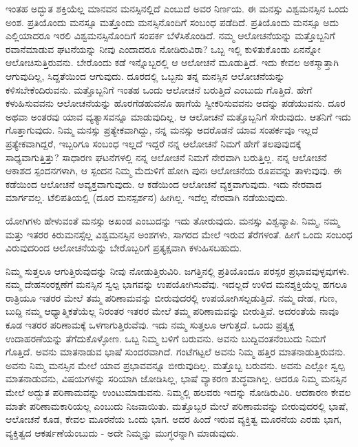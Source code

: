 ಇಂತಹ ಅದ್ಭುತ ಶಕ್ತಿಯೆಲ್ಲ ಮಾನವನ ಮನಸ್ಸಿನಲ್ಲಿದೆ ಎಂಬುದೆ ಅವರ ನಿರ್ಣಯ. ಈ ಮನಸ್ಸು ವಿಶ್ವಮನಸ್ಸಿನ ಒಂದು ಅಂಶ. ಪ್ರತಿಯೊಂದು ಮನಸ್ಸೂ ಮತ್ತೊಂದು ಮನಸ್ಸಿನೊಂದಿಗೆ ಸಂಬಂಧ ಪಡೆದಿದೆ. ಪ್ರತಿಯೊಂದು ಮನಸ್ಸೂ ಅದು ಎಲ್ಲಿಯಾದರೂ ಇರಲಿ ವಿಶ್ವಮನಸ್ಸಿನೊಂದಿಗೆ ಸಂಪರ್ಕ ಬೆಳೆಸಿಕೊಂಡಿದೆ. ನಮ್ಮ ಆಲೋಚನೆಯನ್ನು ಮತ್ತೊಬ್ಬನಿಗೆ ರವಾನೆಮಾಡುವ ಘಟನೆಯನ್ನು ನೀವು ಎಂದಾದರೂ ನೋಡಿರುವಿರಾ? ಒಬ್ಬ ಇಲ್ಲಿ ಕುಳಿತುಕೊಂಡು ಏನನ್ನೋ ಆಲೋಚಿಸುತ್ತಿರುವನು. ಬೇರೊಂದು ಕಡೆ ಇನ್ನೊಬ್ಬರಲ್ಲಿ ಆ ಆಲೋಚನೆ ಮೂಡುತ್ತಿದೆ. ಇದು ಕೇವಲ ಅಕಸ್ಮಾತ್ತಾಗಿ ಆಗುವುದಿಲ್ಲ, ಸಿದ್ದತೆಯಿಂದ ಆಗುವುದು. ದೂರದಲ್ಲಿ ಒಬ್ಬನು ತನ್ನ ಮನಸ್ಸಿನ ಆಲೋಚನೆಯನ್ನು ಕಳಿಸಬೇಕೆಂದಿರುವನು. ಮತ್ತೊಬ್ಬನಿಗೆ ಇಂತಹ ಒಂದು ಆಲೋಚನೆ ಬರುತ್ತಿದೆ ಎಂಬುದು ಗೊತ್ತಿದೆ. ಹೇಗೆ ಕಳುಹಿಸುವವನು ಆಲೋಚನೆಯನ್ನು ಹೊರಗೆಡಹುವನೊ ಹಾಗೆಯೆ ಸ್ವೀಕರಿಸುವವನು ಅದನ್ನು ಪಡೆಯುವನು. ದೂರ ಅಥವಾ ಅಂತರವು ಯಾವ ವ್ಯತ್ಯಾಸವನ್ನೂ ಮಾಡುವುದಿಲ್ಲ. ಆ ಆಲೋಚನೆ ಮತ್ತೊಬ್ಬನಿಗೆ ಸೇರುವುದು. ಆತನಿಗೆ ಇದು ಗೊತ್ತಾಗುವುದು. ನಿಮ್ಮ ಮನಸ್ಸು ಪ್ರತ್ಯೇಕವಾಗಿದ್ದು, ನನ್ನ ಮನಸ್ಸು ಅದರೊಡನೆ ಯಾವ ಸಂಪರ್ಕವೂ ಇಲ್ಲದೆ ಪ್ರತ್ಯೇಕವಾಗಿದ್ದರೆ, ಇಬ್ಬರಿಗೂ ಸಂಬಂಧ ಇಲ್ಲದೆ ಇದ್ದರೆ ನನ್ನ ಆಲೋಚನೆ ನಿಮಗೆ ಹೇಗೆ ತಲಪುವುದಕ್ಕೆ ಸಾಧ್ಯವಾಗುತ್ತಿತ್ತು? ಸಾಧಾರಣ ಘಟನೆಗಳಲ್ಲಿ ನನ್ನ ಆಲೋಚನೆ ನಿಮಗೆ ನೇರವಾಗಿ ಬರುತ್ತಿಲ್ಲ. ನನ್ನ ಆಲೋಚನೆ ಆಕಾಶದ ಸ್ಪಂದನಗಳಾಗಿ, ಆ ಸ್ಪಂದನ ನಿಮ್ಮ ಮೆದುಳಿಗೆ ಹೋಗಿ ಪುನಃ ಆಲೋಚನೆಯ ರೂಪವನ್ನು ತಾಳುವುವು. ಈ ಕಡೆಯಿಂದ ಆಲೋಚನೆ ಅವ್ಯಕ್ತವಾಗುವುದು. ಆ ಕಡೆಯಿಂದ ಆಲೋಚನೆ ವ್ಯಕ್ತವಾಗುವುದು. ಇದು ನೇರವಾದ ಮಾರ್ಗವಲ್ಲ. ಟೆಲಿಪತಿಯಲ್ಲಿ (ದೂರ ಮನಸ್ಪರ್ಶನ) ಹೀಗಿಲ್ಲ. ಇದೆಲ್ಲ ನೇರವಾಗಿ ನಡೆಯುವುದು.

ಯೋಗಿಗಳು ಹೇಳುವಂತೆ ಮನಸ್ಸು ಅಖಂಡ ಎಂಬುದನ್ನು ಇದು ತೋರುವುದು. ಮನಸ್ಸು ವಿಶ್ವವ್ಯಾಪಿ. ನಿಮ್ಮ, ನಮ್ಮ ಮತ್ತು ಇತರರ ಕಿರುಮನಸ್ಸೆಲ್ಲ ವಿಶ್ವಮನಸ್ಸಿನ ಅಂಶಗಳು, ಸಾಗರದ ಮೇಲೆ ಇರುವ ತೆರೆಗಳಂತೆ. ಹೀಗೆ ಒಂದು ಸಂಬಂಧ ವಿರುವುದರಿಂದ ಆಲೋಚನೆಯನ್ನು ಬೇರೊಬ್ಬರಿಗೆ ಪ್ರತ್ಯಕ್ಷವಾಗಿ ಕಳುಹಿಸಬಹುದು.

ನಿಮ್ಮ ಸುತ್ತಲೂ ಆಗುತ್ತಿರುವುದನ್ನು ನೀವು ನೋಡುತ್ತಿರುವಿರಿ. ಜಗತ್ತಿನಲ್ಲಿ ಪ್ರತಿಯೊಂದೂ ಪರಸ್ಪರ ಪ್ರಭಾವವುಳ್ಳವುಗಳು. ನಮ್ಮ ದೇಹಸಂರಕ್ಷಣೆಗೆ ಮನಸ್ಸಿನ ಸ್ವಲ್ಪ ಭಾಗವನ್ನು ಉಪಯೋಗಿಸುವೆವು. ಇದಲ್ಲದೆ ಉಳಿದ ಮನಶ್ಶಕ್ತಿಯೆಲ್ಲ ಹಗಲೂ ರಾತ್ರಿಯೂ ಇತರರ ಮೇಲೆ ತಮ್ಮ ಪರಿಣಾಮವನ್ನು ಬೀರುವುದರಲ್ಲಿ ಉಪಯೋಗಿಸಲ್ಪಡುತ್ತಿದೆ. ನಮ್ಮ ದೇಹ, ಗುಣ, ಬುದ್ದಿ ನಮ್ಮ ಆಧ್ಯಾತ್ಮಿಕತೆಯೆಲ್ಲ ನಿರಂತರ ಇತರರ ಮೇಲೆ ತಮ್ಮ ಪರಿಣಾಮವನ್ನು ಬೀರುತ್ತಿವೆ. ಅದರಂತೆಯೆ ನಾವೂ ಕೂಡ ಇತರರ ಪರಿಣಾಮಕ್ಕೆ ಒಳಗಾಗುತ್ತಿರುವೆವು. ಇದು ನಮ್ಮ ಸುತ್ತಲೂ ಆಗುತ್ತದೆ. ಒಂದು ಪ್ರತ್ಯಕ್ಷ ಉದಾಹರಣೆಯನ್ನು ತೆಗೆದುಕೊಳ್ಳೋಣ. ಒಬ್ಬ ನಿಮ್ಮ ಬಳಿಗೆ ಬರುವನು. ಅವನು ಬುದ್ದಿವಂತನೆಂಬುದು ನಿಮಗೆ ಗೊತ್ತಿದೆ. ಅವನು ಮಾತನಾಡುವ ಭಾಷೆ ಸುಂದರವಾಗಿದೆ. ಗಂಟೆಗಟ್ಟಲೆ ಅವನು ನಿಮ್ಮ ಹತ್ತಿರ ಮಾತನಾಡುತ್ತಿರುವನು. ಅವನು ನಿಮ್ಮ ಮನಸ್ಸಿನ ಮೇಲೆ ಯಾವ ಪ್ರಭಾವವನ್ನೂ ಬೀರುವುದಿಲ್ಲ. ಮತ್ತೊಬ್ಬ ಬರುವನು. ಅವನು ಎಲ್ಲೋ ಸ್ವಲ್ಪ ಮಾತನಾಡುವನು, ವಿಷಯಗಳನ್ನು ಸರಿಯಾಗಿ ಜೋಡಿಸಿಲ್ಲ, ಭಾಷೆ ವ್ಯಾಕರಣ ಶುದ್ಧವಾಗಿಲ್ಲ. ಆದರೂ ನಿಮ್ಮ ಮನಸ್ಸಿನ ಮೇಲೆ ಅದ್ಭುತ ಪರಿಣಾಮವನ್ನು ಉಂಟುಮಾಡುವನು. ನಿಮ್ಮಲ್ಲಿ ಹಲವರು ಇದನ್ನು ನೋಡಿರುವಿರಿ. ಆದಕಾರಣ ಕೇವಲ ಮಾತೇ ಪರಿಣಾಮಕಾರಿಯಲ್ಲ ಎಂಬುದು ನಿಜವಾಯಿತು. ಮತ್ತೊಬ್ಬರ ಮೇಲೆ ಪರಿಣಾಮವನ್ನು ಬೀರುವುದರಲ್ಲಿ ಭಾಷೆ, ಆಲೋಚನೆ ಕೂಡ, ಕೇವಲ ಮೂರನೆಯ ಒಂದು ಭಾಗ. ಅದರ ಹಿಂದೆ ಇರುವ ವ್ಯಕ್ತಿತ್ವ ಮೂರನೆಯ ಎರಡು ಭಾಗ, ವ್ಯಕ್ತಿತ್ವದ ಆಕರ್ಷಣೆಯೆಂಬುದು - ಅದೇ ನಿಮ್ಮನ್ನು ಮುಗ್ಧರನ್ನಾಗಿ ಮಾಡುವುದು.

